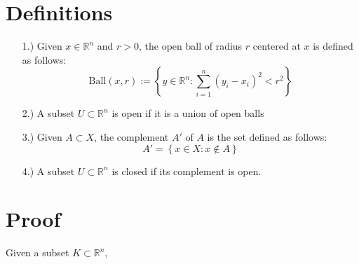 \documentclass[12pt]{article}
\newcommand{\braces}[1]{\left\{#1\right\}}           %
\newcommand{\R}{\mathbb{R}}
\begin{document}
\pagestyle{fancy}
\fancyhead{}

\normalsize

\section*{Definitions}
\begin{itemize}
    \item [1.)] Given $x\in\R^n$ and $r>0$, the open ball of radius $r$ centered at $x$ is defined as follows:
    \[\text{Ball}(x,r):=\braces{y\in\R^n:\sum_{i=1}^n(y_i-x_i)^2<r^2}\]

    \item [2.)] A subset $U\subset\R^n$ is open if it is a union of open balls

    \item [3.)] Given $A\subset X$, the complement $A'$ of $A$ is the set defined as follows:
    \[A'=\braces{x\in X:x\notin A}\]

    \item [4.)] A subset $U\subset\R^n$ is closed if its complement is open.
\end{itemize}

\section*{Proof}

Given a subset $K\subset\R^n$,
\end{document}
